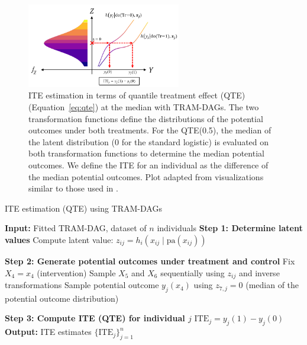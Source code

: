 \begin{figure}[H]
\centering
\includegraphics[width=0.6\textwidth]{img/potential_outcomes_y.png}
\caption{ITE estimation in terms of quantile treatment effect (QTE) (Equation~\ref{eq:qte}) at the median with TRAM-DAGs. The two transformation functions define the distributions of the potential outcomes under both treatments. For the QTE(0.5), the median of the latent distribution (0 for the standard logistic) is evaluated on both transformation functions to determine the median potential outcomes. We define the ITE for an individual as the difference of the median potential outcomes. Plot adapted from visualizations similar to those used in \citet{sick2025}.}
\label{fig:exp4_potential_outcomes}
\end{figure}


\begin{algorithm}
\caption{ITE estimation (QTE) using TRAM-DAGs}
\label{alg:ite_qte}
\begin{algorithmic}
\State \textbf{Input:} Fitted TRAM-DAG, dataset of $n$ individuals
  \State \textbf{Step 1: Determine latent values}
    \State Compute latent value: $z_{ij} = h_i(x_{ij} \mid \text{pa}(x_{ij}))$
  \EndFor

  \State \textbf{Step 2: Generate potential outcomes under treatment and control}
   
    \State Fix $X_4 = x_4$ (intervention)
    \State Sample $X_5$ and $X_6$ sequentially using $z_{ij}$ and inverse transformations
    \State Sample potential outcome $y_j(x_4)$ using $z_{7,j} = 0$ (median of the potential outcome distribution)

  \EndFor

  \State \textbf{Step 3: Compute ITE (QTE) for individual $j$}
  \State $\text{ITE}_j = y_j(1) - y_j(0)$  %
\EndFor
\State \textbf{Output:} ITE estimates $\{\text{ITE}_j\}_{j=1}^n$
\end{algorithmic}
\end{algorithm}


